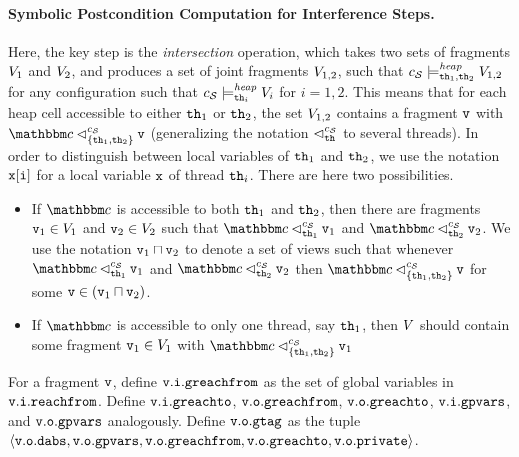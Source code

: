 \paragraph{Symbolic Postcondition Computation for Interference Steps.} 
Here, the key step is the {\em intersection} operation, which
takes two sets of fragments
$V_1$ and $V_2$, and produces a set of joint fragments
$V_{1,2}$, such that
$c_{\mathcal S} \models_{{\tt th}_1,{\tt th}_2}^{\mathit{heap}} V_{1,2}$ for any configuration
such that
$c_{\mathcal S} \models_{{\tt th}_i}^{\mathit{heap}} V_i$ for $i=1,2$.
This means that for each heap cell accessible to either
${\tt th}_1$ or ${\tt th}_2$, the set $V_{1,2}$ 
contains a fragment $\mathtt{v}$ with $\cell \satfrag{\{\thread_1,\thread_2\}}{\sconf} \frag$ (generalizing the notation  $\lhd_{{\tt th}}^{c_{\mathcal S}}$ to several
threads).
In order to distinguish
between local variables of ${\tt th}_1$ and ${\tt th}_2$, we use the notation
$\mathtt{x[i]}$ for a local variable $\mathtt{x}$ of thread ${\tt th}_i$.
There are  here two possibilities.
\begin{itemize}
\item If $\cell$ is accessible to both ${\tt th}_1$ and ${\tt th}_2$, then
  there are fragments $\mathtt{v}_1 \in V_1$ and $\mathtt{v}_2 \in V_2$
  such that $\cell \satfrag{\thread_1}{\sconf} \frag_1$ and $\cell \satfrag{\thread_2}{\sconf} \frag_2$.
  We use the notation $\mathtt{v}_1 \sqcap \mathtt{v}_2$ to denote a set of views such that
  whenever $\cell \satfrag{\thread_1}{\sconf} \frag_1$ and $\cell \satfrag{\thread_2}{\sconf} \frag_2$ then
  $\cell \satfrag{\{\thread_1,\thread_2\}}{\sconf} \frag$ for some $\mathtt{v} \in (\mathtt{v}_1 \sqcap \mathtt{v}_2)$.
\item If $\cell$ is accessible to only one thread,
  say ${\tt th}_1$, then $V$ should contain some fragment
  $\mathtt{v}_1 \in V_1$ with $\cell \satfrag{\set{\thread_1,\thread_2}}{\sconf} \frag_1$
\end{itemize}
For a fragment $\mathtt{v}$, define
$\mathtt{v}.\mathtt{i}.\mathtt{greachfrom}$ as the set of global variables in
$\mathtt{v}.\mathtt{i}.\mathtt{reachfrom}$. Define
$\mathtt{v}.\mathtt{i}.\mathtt{greachto}$,
$\mathtt{v}.\mathtt{o}.\mathtt{greachfrom}$,
$\mathtt{v}.\mathtt{o}.\mathtt{greachto}$,
$\mathtt{v}.\mathtt{i}.\mathtt{gpvars}$, and
$\mathtt{v}.\mathtt{o}.\mathtt{gpvars}$
analogously.
Define $\mathtt{v}.\mathtt{o}.\mathtt{gtag}$ as the tuple
$\left\langle\mathtt{v}.\mathtt{o}.\mathtt{dabs},\mathtt{v}.\mathtt{o}.\mathtt{gpvars},\mathtt{v}.\mathtt{o}.\mathtt{greachfrom},\mathtt{v}.\mathtt{o}.\mathtt{greachto},\mathtt{v}.\mathtt{o}.\mathtt{private}\right\rangle$.

